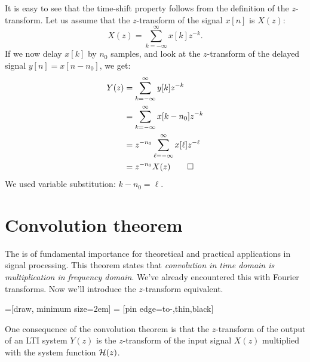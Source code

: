 It is easy to see that the time-shift property follows from the
definition of the $z$-transform. Let us assume that the $z$-transform of
the signal $x[n]$ is $X(z)$:
\begin{equation}
X(z) = \sum_{k=-\infty}^{\infty} x[k] z^{-k}.
\end{equation}
If we now delay $x[k]$ by $n_0$ samples, and look at the $z$-transform
of the delayed signal $y[n]=x[n-n_0]$, we get:
\begin{align}
Y(z) &= \sum_{k=-\infty}^{\infty} y[k] z^{-k}\\
    &= \sum_{k=-\infty}^{\infty} x[k-n_0] z^{-k}\\
     &= z^{-n_0}\sum_{\ell=-\infty}^{\infty} x[\ell] z^{-\ell}\\
     &= z^{-n_0}X(z)\qed
\end{align}
We used variable substitution: $k-n_0 = \ell$. 



\section{Convolution theorem}
The  is of fundamental
importance for theoretical and practical applications in signal
processing. This theorem states that \emph{convolution in time domain 
is multiplication in frequency domain}. We've already encountered
this with Fourier transforms. Now we'll introduce the $z$-transform
equivalent.

=[draw, minimum size=2em]  = [pin
  edge={to-,thin,black}]
\begin{marginfigure}
\begin{center}
\end{center}
\caption{One consequence of the convolution theorem is that the $z$-transform of the output of an LTI system $Y(z)$ is the $z$-transform of the input signal $X(z)$ multiplied with the system function $\mathcal{H}(z)$.}
\end{marginfigure}

